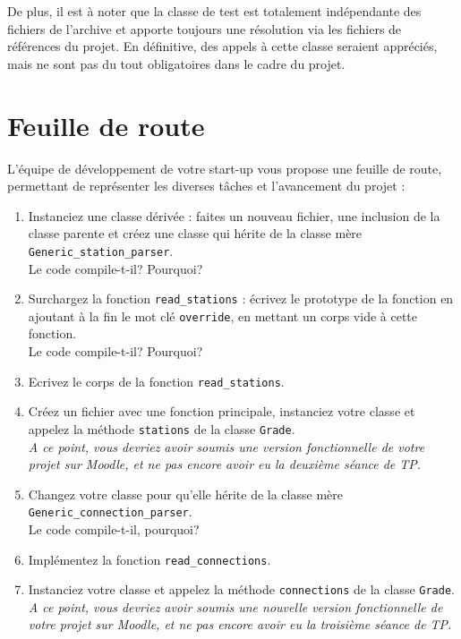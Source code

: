 \documentclass[9pts]{article}
\begin{document}
De plus, il est à noter que la classe de test est totalement indépendante des fichiers de l'archive et apporte toujours une résolution via les fichiers de références du projet. En définitive, des appels à cette classe seraient appréciés, mais ne sont pas du tout obligatoires dans le cadre du projet.

\pagebreak

\section{Feuille de route}
\label{sec::feuille}
L'équipe de développement de votre start-up vous propose une feuille de route, permettant de représenter les diverses tâches et l'avancement du projet :

\begin{enumerate}
\item Instanciez une classe dérivée : faites un nouveau fichier, une inclusion de la classe parente et créez une classe qui hérite de la classe mère \texttt{Generic\_station\_parser}.\\
Le code compile-t-il? Pourquoi?
\item Surchargez la fonction \texttt{read\_stations} : écrivez le prototype de la fonction en ajoutant à la fin le mot clé \texttt{override}, en mettant un corps vide à cette fonction.\\
Le code compile-t-il? Pourquoi?
\item Ecrivez le corps de la fonction \texttt{read\_stations}.
\item Créez un fichier avec une fonction principale, instanciez votre classe et appelez la méthode \texttt{stations} de la classe \texttt{Grade}.\\

\emph{A ce point, vous devriez avoir soumis une version fonctionnelle de votre projet sur Moodle, et ne pas encore avoir eu la deuxième séance de TP.}\\

\item Changez votre classe pour qu'elle hérite de la classe mère \texttt{Generic\_connection\_parser}.\\
Le code compile-t-il, pourquoi?
\item Implémentez la fonction \texttt{read\_connections}.
\item Instanciez votre classe et appelez la méthode \texttt{connections} de la classe \texttt{Grade}.\\

\emph{A ce point, vous devriez avoir soumis une nouvelle version fonctionnelle de votre projet sur Moodle, et ne pas encore avoir eu la troisième séance de TP.}\\


\end{enumerate}
\end{document}
